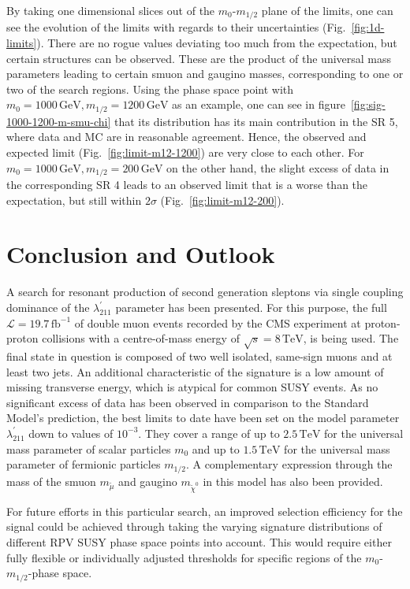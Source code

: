 By taking one dimensional slices out of the $m_0$-$m_{1/2}$ plane of the limits, one can see the evolution of the limits with regards to their uncertainties (Fig.~\ref{fig:1d-limits}). There are no rogue values deviating too much from the expectation, but certain structures can be observed. These are the product of the universal mass parameters leading to certain smuon and gaugino masses, corresponding to one or two of the search regions. Using the phase space point with $m_0 = 1000\,\text{GeV}, m_{1/2} = 1200\,\text{GeV}$ as an example, one can see in figure~\ref{fig:sig-1000-1200-m-smu-chi} that its distribution has its main contribution in the SR 5, where data and MC are in reasonable agreement. Hence, the observed and expected limit (Fig.~\ref{fig:limit-m12-1200}) are very close to each other. For $m_0 = 1000\,\text{GeV}, m_{1/2} = 200\,\text{GeV}$ on the other hand, the slight excess of data in the corresponding SR 4 leads to an observed limit that is a worse than the expectation, but still within $2\sigma$ (Fig.~\ref{fig:limit-m12-200}).

\section{Conclusion and Outlook}
\label{sec:conclusion}

A search for resonant production of second generation sleptons via single coupling dominance of the $\lambda^{\prime}_{211}$ parameter has been presented. For this purpose, the full $\mathcal{L} = 19.7\,\text{fb}^{-1}$ of double muon events recorded by the CMS experiment at proton-proton collisions with a centre-of-mass energy of $\sqrt{s} = 8\,\text{TeV}$, is being used. The final state in question is composed of two well isolated, same-sign muons and at least two jets. An additional characteristic of the signature is a low amount of missing transverse energy, which is atypical for common SUSY events. As no significant excess of data has been observed in comparison to the Standard Model's prediction, the best limits to date have been set on the model parameter $\lambda^{\prime}_{211}$ down to values of $10^{-3}$. They cover a range of up to $2.5\,\text{TeV}$ for the universal mass parameter of scalar particles $m_0$ and up to $1.5\,\text{TeV}$ for the universal mass parameter of fermionic particles $m_{1/2}$. A complementary expression through the mass of the smuon $m_{\tilde{\mu}}$ and gaugino $m_{\tilde{\chi}^0}$ in this model has also been provided.

For future efforts in this particular search, an improved selection efficiency for the signal could be achieved through taking the varying signature distributions of different RPV SUSY phase space points into account. This would require either fully flexible or individually adjusted thresholds for specific regions of the $m_0$-$m_{1/2}$-phase space.

